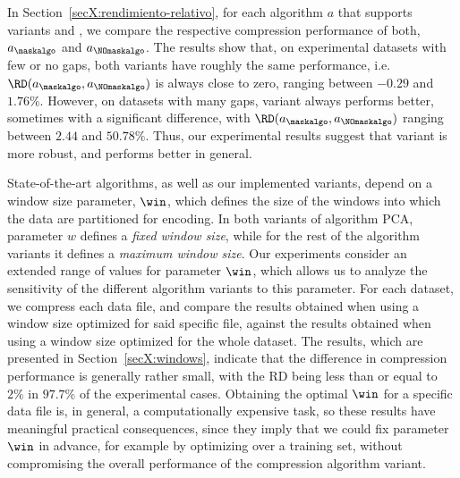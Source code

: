 In Section~\ref{secX:rendimiento-relativo}, for each algorithm $a$ that supports variants \maskalgo and \NOmaskalgo, we compare the respective compression performance of both, $a_\maskalgo$ and $a_\NOmaskalgo$. The results show that, on experimental datasets with few or no gaps, both variants have roughly the same performance, i.e. $\RD(a_\maskalgo, a_\NOmaskalgo)$ is always close to zero, ranging between $-0.29$ and $1.76\%$. However, on datasets with many gaps, variant \maskalgo always performs better, sometimes with a significant difference, with $\RD(a_\maskalgo, a_\NOmaskalgo)$ ranging between $2.44$ and $50.78\%$. Thus, our experimental results suggest that variant \maskalgo is more robust, and performs better in general.


State-of-the-art algorithms, as well as our implemented variants, depend on a window size parameter, $\win$, which defines the size of the windows into which the data are partitioned for encoding. In both variants of algorithm PCA, parameter $w$ defines a \textit{fixed window size}, while for the rest of the algorithm variants it defines a \textit{maximum window size}. Our experiments consider an extended range of values for parameter $\win$, which allows us to analyze the sensitivity of the different algorithm variants to this parameter. For each dataset, we compress each data file, and compare the results obtained when using a window size optimized for said specific file, against the results obtained when using a window size optimized for the whole dataset. The results, which are presented in Section~\ref{secX:windows}, indicate that the difference in compression performance is generally rather small, with the RD being less than or equal to $2\%$ in $97.7\%$ of the experimental cases. Obtaining the optimal $\win$ for a specific data file is, in general, a computationally expensive task, so these results have meaningful practical consequences, since they imply that we could fix parameter $\win$ in advance, for example by optimizing over a training set, without compromising the overall performance of the compression algorithm variant. 


